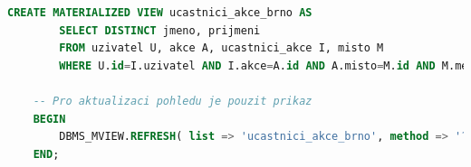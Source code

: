 \documentclass[11pt,a4paper]{article}
\begin{document}
    \begin{minipage}{\linewidth}
        \begin{center}
            \begin{lstlisting}[language=sql]
    CREATE MATERIALIZED VIEW ucastnici_akce_brno AS
        SELECT DISTINCT jmeno, prijmeni
        FROM uzivatel U, akce A, ucastnici_akce I, misto M
        WHERE U.id=I.uzivatel AND I.akce=A.id AND A.misto=M.id AND M.mesto='Brno';

    -- Pro aktualizaci pohledu je pouzit prikaz
    BEGIN
        DBMS_MVIEW.REFRESH( list => 'ucastnici_akce_brno', method => '?');
    END;\end{lstlisting}
        \end{center}
    \end{minipage}
    
\end{document}
